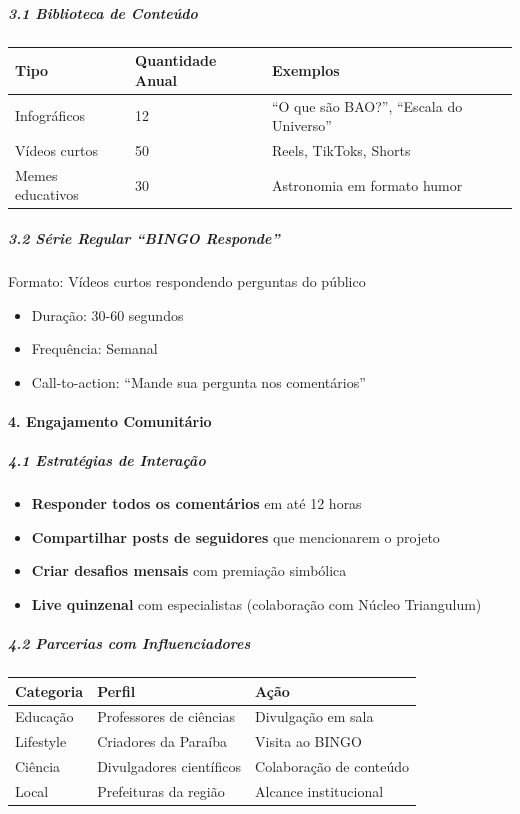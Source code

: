 \subparagraph{3.1 Biblioteca de Conteúdo}

\bigskip\noindent
\begin{tabular}{p{}p{}p{}}
\toprule
Tipo & Quantidade Anual & Exemplos \\
\hline
Infográficos & 12 & ``O que são BAO?'', ``Escala do Universo'' \\
Vídeos curtos & 50 & Reels, TikToks, Shorts \\
Memes educativos & 30 & Astronomia em formato humor \\
\bottomrule
\end{tabular}

\bigskip

\subparagraph{3.2 Série Regular ``BINGO Responde''}

Formato: Vídeos curtos respondendo perguntas do público

\begin{itemize}
\item Duração: 30-60 segundos
\item Frequência: Semanal
\item Call-to-action: ``Mande sua pergunta nos comentários''
\end{itemize}

\paragraph{4. Engajamento Comunitário}

\subparagraph{4.1 Estratégias de Interação}

\begin{itemize}
\item \textbf{Responder todos os comentários} em até 12 horas
\item \textbf{Compartilhar posts de seguidores} que mencionarem o projeto
\item \textbf{Criar desafios mensais} com premiação simbólica
\item \textbf{Live quinzenal} com especialistas (colaboração com Núcleo Triangulum)
\end{itemize}

\subparagraph{4.2 Parcerias com Influenciadores}

\bigskip\noindent
\begin{tabular}{p{}p{}p{}}
\toprule
Categoria & Perfil & Ação \\
\hline
Educação & Professores de ciências & Divulgação em sala \\
Lifestyle & Criadores da Paraíba & Visita ao BINGO \\
Ciência & Divulgadores científicos & Colaboração de conteúdo \\
Local & Prefeituras da região & Alcance institucional \\
\bottomrule
\end{tabular}

